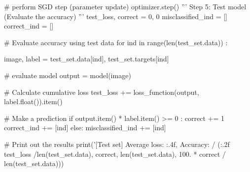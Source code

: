 \documentclass[10pt]{article}
\begin{document}
\begin{python}
    # perform SGD step (parameter update)
    optimizer.step()
'''
Step 5: Test model (Evaluate the accuracy)
'''
test_loss, correct = 0, 0
misclassified_ind = []
correct_ind = []

# Evaluate accuracy using test data
for ind in range(len(test_set.data)) :

    image, label = test_set.data[ind], test_set.targets[ind]

    # evaluate model
    output = model(image)

    # Calculate cumulative loss
    test_loss += loss_function(output, label.float()).item()

    # Make a prediction
    if output.item() * label.item() >= 0 :
        correct += 1
        correct_ind += [ind]
    else:
        misclassified_ind += [ind]

# Print out the results
print('[Test set] Average loss: {:.4f}, Accuracy: {}/{} ({:.2f}%
        test_loss /len(test_set.data), correct, len(test_set.data),
        100. * correct / len(test_set.data)))

\end{python}
\end{document}
